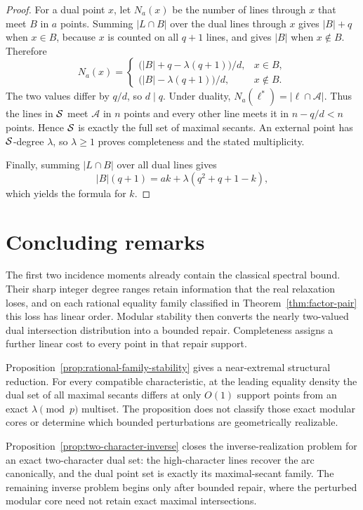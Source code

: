 \begin{proof}
For a dual point \(x\), let \(N_a(x)\) be the number of lines through \(x\)
that meet \(B\) in \(a\) points.  Summing \(|L\cap B|\) over the dual lines
through \(x\) gives \(|B|+q\) when \(x\in B\), because \(x\) is counted on
all \(q+1\) lines, and gives \(|B|\) when \(x\notin B\).  Therefore
\[
 N_a(x)=
 \begin{cases}
 \bigl(|B|+q-\lambda(q+1)\bigr)/d,&x\in B,\\[2mm]
 \bigl(|B|-\lambda(q+1)\bigr)/d,&x\notin B.
 \end{cases}
\]
The two values differ by \(q/d\), so \(d\mid q\).  Under duality,
\(N_a(\ell^*)=|\ell\cap\mathcal A|\).  Thus the lines in \(\mathcal S\) meet
\(\mathcal A\) in \(n\) points and every other line meets it in
\(n-q/d<n\) points.  Hence \(\mathcal S\) is exactly the full set of maximal
secants.  An external point has \(\mathcal S\)-degree \(\lambda\), so
\(\lambda\ge1\) proves completeness and the stated multiplicity.

Finally, summing \(|L\cap B|\) over all dual lines gives
\[
 |B|(q+1)=ak+\lambda(q^2+q+1-k),
\]
which yields the formula for \(k\).
\end{proof}

\section{Concluding remarks}\label{sec:conclusion}

The first two incidence moments already contain the classical spectral bound.
Their sharp integer degree ranges retain information that the real relaxation
loses, and on each rational equality family classified in
Theorem~\ref{thm:factor-pair} this loss has linear order.
Modular stability then converts the nearly two-valued dual intersection
distribution into a bounded repair.  Completeness assigns a further linear
cost to every point in that repair support.

Proposition~\ref{prop:rational-family-stability} gives a near-extremal
structural reduction.  For every compatible characteristic, at the leading
equality density the dual set of all maximal secants differs at only \(O(1)\)
support points from an exact \(\lambda\pmod p\) multiset.  The proposition
does not classify those exact modular cores or determine which bounded
perturbations are geometrically realizable.

Proposition~\ref{prop:two-character-inverse} closes the inverse-realization
problem for an exact two-character dual set: the high-character lines recover
the arc canonically, and the dual point set is exactly its maximal-secant
family.  The remaining inverse problem begins only after bounded repair, where
the perturbed modular core need not retain exact maximal intersections.

